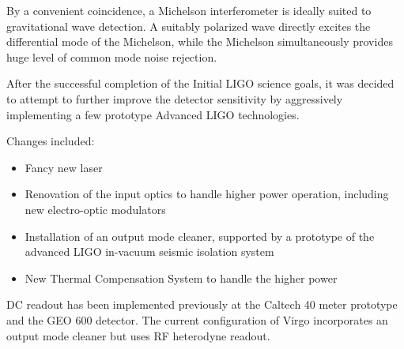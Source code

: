 \label{chapter2}
\doublespace


By a convenient coincidence, a Michelson interferometer is ideally
suited to gravitational wave detection.  A suitably polarized wave
directly excites the differential mode of the Michelson, while the
Michelson simultaneously provides huge level of common mode noise
rejection.

\cite{Fritschel2001Readout}


After the successful completion of the Initial LIGO science goals, it
was decided
\cite{Adhikari2006Enhanced,T050252,JoshSmithEnhancedAdvanced} to
attempt to further improve the detector sensitivity by aggressively
implementing a few prototype Advanced LIGO technologies.

Changes included:
\begin{itemize}
\item Fancy new laser
\item Renovation of the input optics to handle higher power operation, including new electro-optic modulators \cite{Quetschke2008ElectroOptic}
\item Installation of an output mode cleaner, supported by a prototype of the advanced LIGO in-vacuum seismic isolation system
\item New Thermal Compensation System to handle the higher power
\end{itemize}

DC readout has been implemented previously at the Caltech 40 meter
prototype \cite{Ward2008DC,RobWardThesis} and the GEO 600
detector\cite{GeoDC,Prijatelj2010,Degallaix2010Commissioning}.  The
current configuration of Virgo incorporates an output mode cleaner but
uses RF heterodyne readout\cite{Acernese2008Virgo}.



